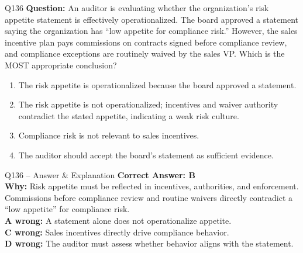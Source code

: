 \documentclass[aspectratio=169,10pt]{beamer}
\begin{document}
	\begin{frame}[t]{Q136}
		\small
		\textbf{Question:} An auditor is evaluating whether the organization's risk appetite statement is effectively operationalized. The board approved a statement saying the organization has ``low appetite for compliance risk.'' However, the sales incentive plan pays commissions on contracts signed before compliance review, and compliance exceptions are routinely waived by the sales VP. Which is the MOST appropriate conclusion?
		\begin{enumerate}[label=\Alph*.,itemsep=1pt,topsep=2pt]
			\item The risk appetite is operationalized because the board approved a statement.
			\item The risk appetite is not operationalized; incentives and waiver authority contradict the stated appetite, indicating a weak risk culture.
			\item Compliance risk is not relevant to sales incentives.
			\item The auditor should accept the board's statement as sufficient evidence.
		\end{enumerate}
	\end{frame}
	
	\begin{frame}[t]{Q136 -- Answer \& Explanation}
		\small
		\textbf{Correct Answer: B} \\[4pt]
		\textbf{Why:} Risk appetite must be reflected in incentives, authorities, and enforcement. Commissions before compliance review and routine waivers directly contradict a ``low appetite'' for compliance risk. \\[4pt]
		\textbf{A wrong:} A statement alone does not operationalize appetite. \\[2pt]
		\textbf{C wrong:} Sales incentives directly drive compliance behavior. \\[2pt]
		\textbf{D wrong:} The auditor must assess whether behavior aligns with the statement.
	\end{frame}
	
\end{document}
